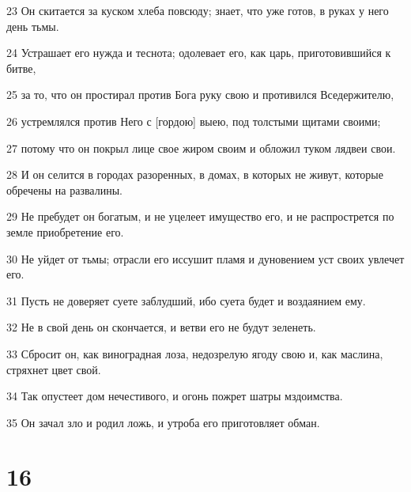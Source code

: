 \par 23 Он скитается за куском хлеба повсюду; знает, что уже готов, в руках у него день тьмы.
\par 24 Устрашает его нужда и теснота; одолевает его, как царь, приготовившийся к битве,
\par 25 за то, что он простирал против Бога руку свою и противился Вседержителю,
\par 26 устремлялся против Него с [гордою] выею, под толстыми щитами своими;
\par 27 потому что он покрыл лице свое жиром своим и обложил туком лядвеи свои.
\par 28 И он селится в городах разоренных, в домах, в которых не живут, которые обречены на развалины.
\par 29 Не пребудет он богатым, и не уцелеет имущество его, и не распрострется по земле приобретение его.
\par 30 Не уйдет от тьмы; отрасли его иссушит пламя и дуновением уст своих увлечет его.
\par 31 Пусть не доверяет суете заблудший, ибо суета будет и воздаянием ему.
\par 32 Не в свой день он скончается, и ветви его не будут зеленеть.
\par 33 Сбросит он, как виноградная лоза, недозрелую ягоду свою и, как маслина, стряхнет цвет свой.
\par 34 Так опустеет дом нечестивого, и огонь пожрет шатры мздоимства.
\par 35 Он зачал зло и родил ложь, и утроба его приготовляет обман.

\chapter{16}

